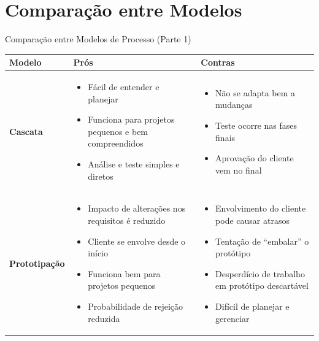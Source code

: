 \documentclass[9pt]{beamer}
\begin{document}
\section{Comparação entre Modelos}

\begin{frame}{Comparação entre Modelos de Processo (Parte 1)}
  \vspace{-0.2cm}
  {\scriptsize
  \begin{tabular}{|p{1.8cm}|p{4cm}|p{4cm}|}
    \hline
    \textbf{Modelo} & \textbf{Prós} & \textbf{Contras} \\
    \hline
    \textbf{Cascata} &
    \begin{itemize}\setlength{\itemsep}{0pt}\setlength{\parskip}{0pt}
      \item Fácil de entender e planejar
      \item Funciona para projetos pequenos e bem compreendidos
      \item Análise e teste simples e diretos
    \end{itemize} &
    \begin{itemize}\setlength{\itemsep}{0pt}\setlength{\parskip}{0pt}
      \item Não se adapta bem a mudanças
      \item Teste ocorre nas fases finais
      \item Aprovação do cliente vem no final
    \end{itemize} \\
    \hline
    \textbf{Prototipação} &
    \begin{itemize}\setlength{\itemsep}{0pt}\setlength{\parskip}{0pt}
      \item Impacto de alterações nos requisitos é reduzido
      \item Cliente se envolve desde o início
      \item Funciona bem para projetos pequenos
      \item Probabilidade de rejeição reduzida
    \end{itemize} &
    \begin{itemize}\setlength{\itemsep}{0pt}\setlength{\parskip}{0pt}
      \item Envolvimento do cliente pode causar atrasos
      \item Tentação de ``embalar'' o protótipo
      \item Desperdício de trabalho em protótipo descartável
      \item Difícil de planejar e gerenciar
    \end{itemize} \\
    \hline
  \end{tabular}
  }
\end{frame}
\end{document}
